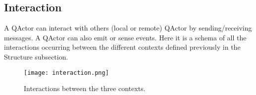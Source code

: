 \subsection{Interaction}
A QActor can interact with others (local or remote) QActor by sending/receiving messages. A QActor can also emit or sense events. Here it is a schema of all the interactions occurring between the different contexts defined previously in the Structure subsection.
\begin{figure}[h]
	\centering
	\texttt{[image: interaction.png]}
	\caption{Interactions between the three contexts.}
\end{figure}
